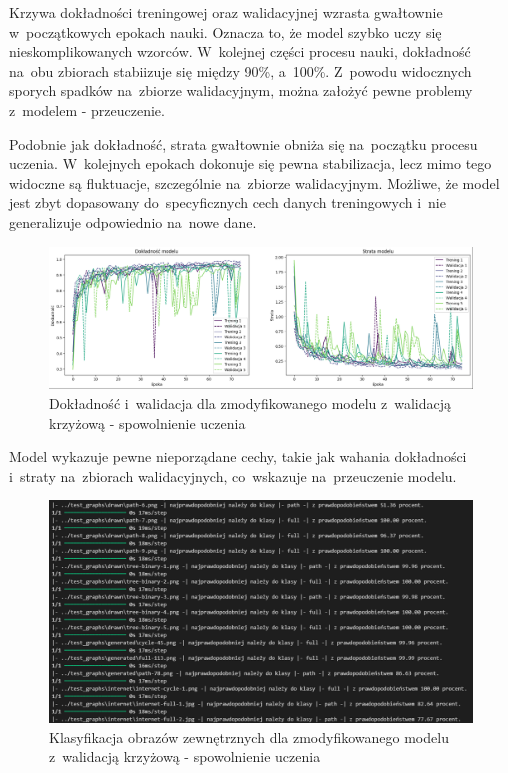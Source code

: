 Krzywa dokładności treningowej oraz walidacyjnej wzrasta gwałtownie w~początkowych epokach nauki.
Oznacza to, że model szybko uczy się nieskomplikowanych wzorców.
W~kolejnej części procesu nauki, dokładność na~obu zbiorach stabiizuje się między 90\%, a~100\%.
Z~powodu widocznych sporych spadków na~zbiorze walidacyjnym, można założyć pewne problemy z~modelem - przeuczenie.

Podobnie jak dokładność, strata gwałtownie obniża się na~początku procesu uczenia.
W~kolejnych epokach dokonuje się pewna stabilizacja, lecz mimo tego widoczne są fluktuacje, szczególnie na~zbiorze walidacyjnym.
Możliwe, że model jest zbyt dopasowany do~specyficznych cech danych treningowych i~nie generalizuje odpowiednio na~nowe dane.

\begin{figure}[ht]
	\centering
	\includegraphics[width=15.5cm]{resources/tests/images/v4/crossvalid_4_img.png}
	\caption{Dokładność i~walidacja dla zmodyfikowanego modelu z~walidacją krzyżową - spowolnienie uczenia}
	\label{Fig:tests-cv-4a}
\end{figure}
\FloatBarrier

Model wykazuje pewne nieporządane cechy, takie jak wahania dokładności i~straty na~zbiorach walidacyjnych,
co~wskazuje na~przeuczenie modelu.

\begin{figure}[ht]
	\centering
	\includegraphics[width=15.5cm]{resources/tests/images/v4/crossvalid_4_txt.png}
	\caption{Klasyfikacja obrazów zewnętrznych dla zmodyfikowanego modelu z~walidacją krzyżową - spowolnienie uczenia}
	\label{Fig:tests-cv-4b}
\end{figure}
\FloatBarrier

